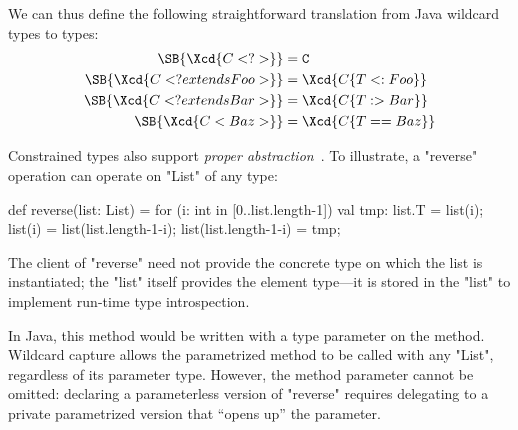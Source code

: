 \noindent
We can thus define the following straightforward translation
from Java wildcard types to \Xten{} types:
\begin{align*}
\SB{ \Xcd{C<?>} } &= {\tt C} \\
\SB{ \Xcd{C<? extends Foo>} } &= \Xcd{C\{T <: Foo\}} \\
\SB{ \Xcd{C<? extends Bar>} } &= \Xcd{C\{T :> Bar\}} \\
\SB{ \Xcd{C<Baz>} } &= \Xcd{C\{T == Baz\}} \\
\end{align*}



Constrained types also support \emph{proper
abstraction}~\cite{adding-wildcards}.  To illustrate, a
\xcd"reverse"
operation can operate on \xcd"List" of any type:
\begin{xten}
def reverse(list: List) = {
  for (i: int in [0..list.length-1]) {
    val tmp: list.T = list(i);
    list(i) = list(list.length-1-i);
    list(list.length-1-i) = tmp;
  }
}
\end{xten}

The client of \xcd"reverse" need not provide the concrete type
on which the list is instantiated; the \xcd"list" itself
provides the element type---it is stored in the \xcd"list"
to implement run-time type introspection.

In Java, this method would be written with a type parameter on
the method.
Wildcard
capture allows the parametrized method to be called with any \xcd"List",
regardless of its parameter type.
However,
the method parameter cannot be omitted: declaring a parameterless version
of \xcd"reverse" requires delegating to a private parametrized version that
``opens up'' the parameter.


